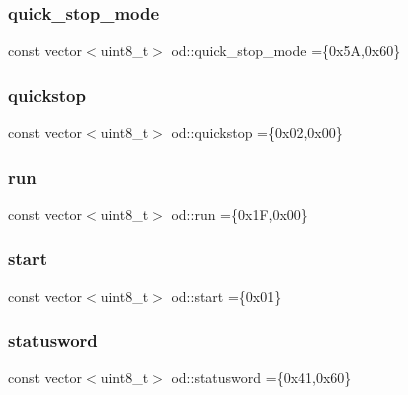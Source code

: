 \mbox{\label{namespaceod_ab5b4d34058d08a758277bf52cd31d8c9}} 
\subsubsection{\texorpdfstring{quick\+\_\+stop\+\_\+mode}{quick\_stop\_mode}}
{\footnotesize\ttfamily const vector$<$uint8\+\_\+t$>$ od\+::quick\+\_\+stop\+\_\+mode =\{0x5\+A,0x60\}}

\mbox{\label{namespaceod_a9afdc654634df7cc336d824c594d484a}} 
\subsubsection{\texorpdfstring{quickstop}{quickstop}}
{\footnotesize\ttfamily const vector$<$uint8\+\_\+t$>$ od\+::quickstop =\{0x02,0x00\}}

\mbox{\label{namespaceod_af47128107b86d08e437f81d48d20b05a}} 
\subsubsection{\texorpdfstring{run}{run}}
{\footnotesize\ttfamily const vector$<$uint8\+\_\+t$>$ od\+::run =\{0x1\+F,0x00\}}

\mbox{\label{namespaceod_a5ca62a6451017dd2a0d53391d6fc5161}} 
\subsubsection{\texorpdfstring{start}{start}}
{\footnotesize\ttfamily const vector$<$uint8\+\_\+t$>$ od\+::start =\{0x01\}}

\mbox{\label{namespaceod_a7fe65fca00afb38d66fb49ec4fdc88c0}} 
\subsubsection{\texorpdfstring{statusword}{statusword}}
{\footnotesize\ttfamily const vector$<$uint8\+\_\+t$>$ od\+::statusword =\{0x41,0x60\}}

